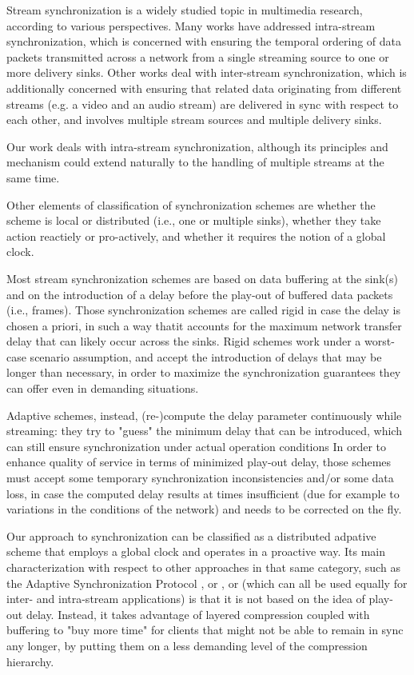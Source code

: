 \documentclass{sig-alternate}
\begin{document}
Stream synchronization is a widely studied topic in multimedia research,
according to various perspectives.
Many works have addressed intra-stream synchronization, which is concerned with 
ensuring the temporal ordering of data packets transmitted across a network from a
single streaming source to one or more delivery sinks. 
Other works deal with inter-stream synchronization, which is additionally concerned
with ensuring that related data originating from different streams (e.g. a video and an audio stream)
are delivered in sync with respect to each other, and involves 
multiple stream sources and multiple delivery sinks.

Our work deals with intra-stream synchronization, although its principles and
mechanism could extend naturally to the handling of multiple streams at the same time.

Other elements of classification of synchronization schemes 
are whether the scheme is local or distributed (i.e., one or multiple sinks),
whether they take action reactiely or pro-actively, and whether
it requires the notion of a global clock.

Most stream synchronization schemes are based on data buffering at the sink(s) and
on the introduction of a delay before the play-out of buffered data packets (i.e., frames).
\cite{ASP, Lancaster, FSP}
Those synchronization schemes are called rigid in case the delay is chosen a priori, 
in such a way thatit accounts for the maximum network transfer delay 
that can likely occur across the sinks.
Rigid schemes work under a worst-case scenario assumption, and accept the introduction of 
delays that may be longer than necessary,
in order to maximize the synchronization guarantees they can offer even in demanding situations.

Adaptive schemes, instead, (re-)compute the delay parameter continuously while streaming:
they try to "guess" the minimum delay that can be introduced, which can still 
ensure synchronization under actual operation conditions 
In order to enhance quality of service in terms of minimized play-out delay, 
those schemes must accept some temporary synchronization inconsistencies and/or some data loss, 
in case the computed delay results at times insufficient (due for example to variations in the 
conditions of the network) and needs to be corrected on the fly.

Our approach to synchronization can be classified as a distributed adpative scheme that employs
a global clock and operates in a proactive way. 
Its main characterization with respect to other approaches in that same category,
such as the Adaptive Synchronization Protocol \cite{ASP}, or \cite{Gonzalez}, or \cite{Liu}
(which can all be used equally for inter- and intra-stream applications)
is that it is not based on the idea of play-out delay.
Instead, it takes advantage of layered compression coupled with buffering 
to "buy more time" for clients
that might not be able to remain in sync any longer, 
by putting them on a less demanding level of the compression hierarchy.
\end{document}
